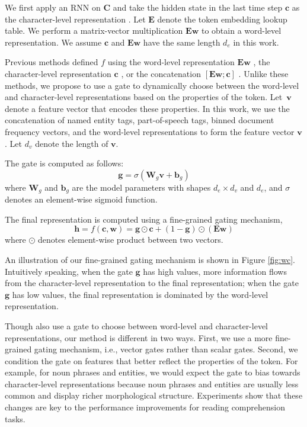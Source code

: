 \documentclass{article} \usepackage{iclr2017_conference,times}
\begin{document}
We first apply an RNN on $\mathbf{C}$ and take the hidden state in the last time step $\mathbf{c}$ as the character-level representation \citep{yang2016multi}. Let $\mathbf{E}$ denote the token embedding lookup table. We perform a matrix-vector multiplication $\mathbf{E} \mathbf{w}$ to obtain a word-level representation. We assume $\mathbf{c}$ and $\mathbf{E} \mathbf{w}$ have the same length $d_e$ in this work.

Previous methods defined $f$ using the word-level representation $\mathbf{E} \mathbf{w}$ \citep{collobert2011natural}, the character-level representation $\mathbf{c}$ \citep{ling2015finding}, or the concatenation $[\mathbf{E} \mathbf{w}; \mathbf{c}]$ \citep{yang2016multi}. Unlike these methods, we propose to use a gate to dynamically choose between the word-level and character-level representations based on the properties of the token. Let~$\mathbf{v}$ denote a feature vector that encodes these properties. In this work, we use the concatenation of named entity tags, part-of-speech tags, binned document frequency vectors, and the word-level representations to form the feature vector $\mathbf{v}$. Let $d_v$ denote the length of $\mathbf{v}$.

The gate is computed as follows:
\[
\mathbf{g} = \sigma (\mathbf{W}_g \mathbf{v} + \mathbf{b}_g)
\]
where $\mathbf{W}_g$ and $\mathbf{b}_g$ are the model parameters with shapes $d_e \times d_v$ and $d_e$, and $\sigma$ denotes an element-wise sigmoid function.

The final representation is computed using a fine-grained gating mechanism,
\[
\mathbf{h} = f(\mathbf{c}, \mathbf{w}) = \mathbf{g} \odot \mathbf{c} + (1 - \mathbf{g}) \odot (\mathbf{E} \mathbf{w})
\]
where $\odot$ denotes element-wise product between two vectors.

An illustration of our fine-grained gating mechanism is shown in Figure \ref{fig:wc}. Intuitively speaking, when the gate $\mathbf{g}$ has high values, more information flows from the character-level representation to the final representation; when the gate $\mathbf{g}$ has low values, the final representation is dominated by the word-level representation.

Though \cite{miyamoto2016gated} also use a gate to choose between word-level and character-level representations, our method is different in two ways. First, we use a more fine-grained gating mechanism, i.e., vector gates rather than scalar gates. Second, we condition the gate on features that better reflect the properties of the token. For example, for noun phrases and entities, we would expect the gate to bias towards character-level representations because noun phrases and entities are usually less common and display richer morphological structure. Experiments show that these changes are key to the performance improvements for reading comprehension tasks.
\end{document}
